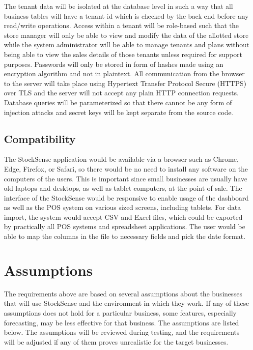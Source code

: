 \documentclass{StockSense}
\begin{document}
The tenant data will be isolated at the database level in such a way that all business tables will have a tenant id which is checked by the back end before any read/write operations. Access within a tenant will be role-based such that the store manager will only be able to view and modify the data of the allotted store while the system administrator will be able to manage tenants and plans without being able to view the sales details of those tenants unless required for support purposes. Passwords will only be stored in form of hashes made using an encryption algorithm and not in plaintext. All communication from the browser to the server will take place using Hypertext Transfer Protocol Secure (HTTPS) over TLS and the server will not accept any plain HTTP connection requests. Database queries will be parameterized so that there cannot be any form of injection attacks and secret keys will be kept separate from the source code.

\subsection{Compatibility}

The StockSense application would be available via a browser such as Chrome, Edge, Firefox, or Safari, so there would be no need to install any software on the computers of the users. This is important since small businesses are usually have old laptops and desktops, as well as tablet computers, at the point of sale. The interface of the StockSense would be responsive to enable usage of the dashboard as well as the POS system on various sized screens, including tablets. For data import, the system would accept CSV and Excel files, which could be exported by practically all POS systems and spreadsheet applications. The user would be able to map the columns in the file to necessary fields and pick the date format.

\section{Assumptions}

The requirements above are based on several assumptions about the businesses that will use StockSense and the environment in which they work. If any of these assumptions does not hold for a particular business, some features, especially forecasting, may be less effective for that business. The assumptions are listed below. The assumptions will be reviewed during testing, and the requirements will be adjusted if any of them proves unrealistic for the target businesses.
\end{document}
